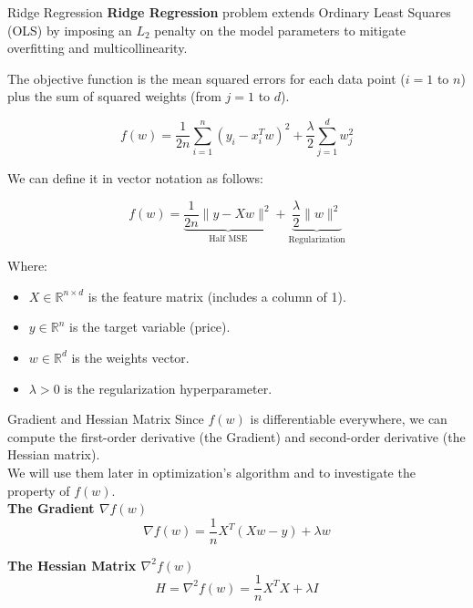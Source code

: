 \documentclass[10pt]{beamer}
\begin{document}
\begin{frame}{Ridge Regression}
    \textbf{Ridge Regression} problem extends Ordinary Least Squares (OLS) by imposing an $L_2$ penalty on the model parameters to mitigate overfitting and multicollinearity.

    \vspace{0.1cm}

    The objective function is the mean squared errors for each data point ($i=1$ to $n$) plus the sum of squared weights (from $j=1$ to $d$).

    $$f(w) = \frac{1}{2n} \sum_{i=1}^{n} (y_i - x_i^T w)^2 + \frac{\lambda}{2} \sum_{j=1}^{d} w_j^2$$

    We can define it in vector notation as follows:

    $$
    f(w) = \underbrace{\frac{1}{2n} \| y - Xw \|^2}_{\text{Half MSE}} + \underbrace{\frac{\lambda}{2} \| w \|^2}_{\text{Regularization}}
    $$

    Where:
    \begin{itemize}
        \item $X \in \mathbb{R}^{n \times d}$ is the feature matrix (includes a column of 1).
        \item $y \in \mathbb{R}^n$ is the target variable (price).
        \item $w \in \mathbb{R}^d$ is the weights vector.
        \item $\lambda > 0$ is the regularization hyperparameter.
    \end{itemize}
\end{frame}

\begin{frame}{Gradient and Hessian Matrix}
    Since $f(w)$ is differentiable everywhere, we can compute the first-order derivative (the Gradient) and second-order derivative (the Hessian matrix).\\[0.2cm]
    We will use them later in optimization's algorithm and to investigate the property of $f(w)$. \\[0.2cm]

    \vspace{0.2cm}
    \textbf{The Gradient $\nabla f(w)$}
    $$\nabla f(w) = \frac{1}{n} X^T (Xw - y) + \lambda w$$

    \textbf{The Hessian Matrix $\nabla^2 f(w)$}
    $$ H = \nabla^2 f(w) = \frac{1}{n} X^T X + \lambda I$$
\end{frame}
\end{document}
